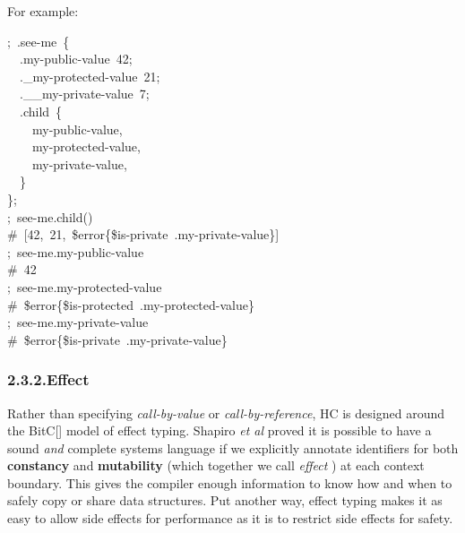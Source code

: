 \documentclass[preprint]{{sigplanconf}}
\begin{document}
\noindent{}For example:%
\begin{mdpre}%
\noindent;~.see-me~\{\\
~~.my-public-value~{42};\\
~~.\_my-protected-value~{21};\\
~~.\_\_my-private-value~7;\\
~~.child~\{\\
~~~~my-public-value,\\
~~~~my-protected-value,\\
~~~~my-private-value,\\
~~\}\\
\};\\
;~see-me.child()\\
{\#~{}[42,~21,~\$error\{\$is-private~.my-private-value\}]}\\
;~see-me.my-public-value\\
{\#~42}\\
;~see-me.my-protected-value\\
{\#~\$error\{\$is-protected~.my-protected-value\}}\\
;~see-me.my-private-value\\
{\#~\$error\{\$is-private~.my-private-value\}}\\
\end{mdpre}
\subsubsection{2.3.2.\hspace*{0.5em}Effect}\label{sec-effect}%

\noindent{}Rather than specifying \emph{call-by-value} or \emph{call-by-reference}, HC is
designed around the BitC[] model of effect typing. Shapiro \emph{et al}
proved it is possible to have a sound \emph{and} complete systems language if
we explicitly annotate identifiers for both \textbf{constancy} and
\textbf{mutability} (which together we call \emph{effect} ) at each context
boundary. This gives the compiler enough information to know how and when
to safely copy or share data structures. Put another way, effect typing
makes it as easy to allow side effects for performance as it is to
restrict side effects for safety.%
\end{document}
